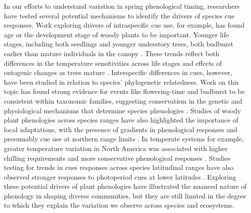 \documentclass{article}\usepackage[]{graphicx}\usepackage[]{color}
\begin{document}
In our efforts to understand variation in spring phenological timing, researchers have tested several potential mechanisms to identify the drivers of species cue responses. Work exploring drivers of intraspecific cue use, for example, has found age or the development stage of woody plants to be important. Younger life stages, including both seedlings and younger understory trees, both budburst earlier than mature individuals in the canopy \citep{Vitasse2013,Seiwa1991}. These trends reflect both differences in the temperature sensitivities across life stages and effects of ontogenic changes as trees mature \citep{Vitasse2013,Seiwa1991}. Interspecific differences in cues, however, have been studied in relation to species' phylogenetic relatedness. Work on this topic has found strong evidence for events like flowering-time and budburst to be consistent within taxonomic families, suggesting conservatism in the genetic and physiological mechanisms that determine species phenologies \citep{Kochmer1986,Davies2013,Gougherty2018}. Studies of woody plant phenologies across species ranges have also highlighted the importance of local adaptations, with the presence of gradients in phenological responses and presumably cue use at northern range limits \citep{Lechowicz1984,Chuine2001,Chuine2010}. In temperate systems for example, greater temperature variation in North America was associated with higher chilling requirements and more conservative phenological responses \citep{Zohner2017}.  Studies testing for trends in cues responses across species latitudinal ranges have also observed stronger responses to photoperiod cues at lower latitudes \citep{Zohner2016}. Exploring these potential drivers of plant phenologies have illustrated the nuanced nature of phenology in shaping diverse communities, but they are still limited in the degree to which they explain the variation we observe across species and ecosystems.\\
\end{document}
